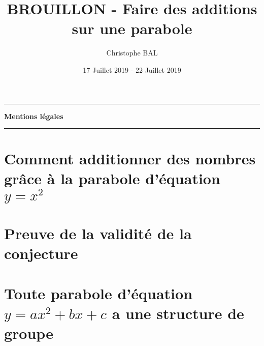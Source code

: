 \documentclass[12pt]{amsart}
\begin{document}
\title{BROUILLON - Faire des additions sur une parabole}
\author{Christophe BAL}
\date{17 Juillet 2019 - 22 Juillet 2019}
\maketitle


\begin{center}
	\hrule\vspace{.3em}
	{
		\fontsize{1.35em}{1em}\selectfont
		\textbf{Mentions \og légales \fg}
	}
			
	\vspace{0.45em}
	\doclicenseThis
	\hrule
\end{center}



\setcounter{tocdepth}{2}
\tableofcontents




\section{\texorpdfstring{Comment additionner des nombres grâce à la parabole d'équation $y = x^2$}%
                        {Comment additionner des nombres grâce à la parabole d'équation y = x**2}}





\section{Preuve de la validité de la conjecture} \label{proof}





\section{\texorpdfstring{Toute parabole d'équation $y = a x^2 + b x + c$ a une structure de groupe}%
                        {Toute parabole d'équation y = a x**2 + b x + c a une structure de groupe}}
      

\end{document}
